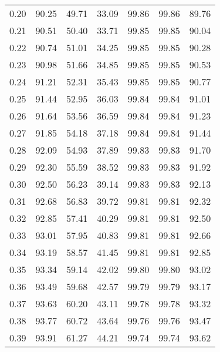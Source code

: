 \begin{tabular}{|c|c|c|c|c|c|c|}
      0.20 &     90.25 &     49.71 &      33.09 &   99.86 &      99.86 &         89.76 \\
      0.21 &     90.51 &     50.40 &      33.71 &   99.85 &      99.85 &         90.04 \\
      0.22 &     90.74 &     51.01 &      34.25 &   99.85 &      99.85 &         90.28 \\
      0.23 &     90.98 &     51.66 &      34.85 &   99.85 &      99.85 &         90.53 \\
      0.24 &     91.21 &     52.31 &      35.43 &   99.85 &      99.85 &         90.77 \\
      0.25 &     91.44 &     52.95 &      36.03 &   99.84 &      99.84 &         91.01 \\
      0.26 &     91.64 &     53.56 &      36.59 &   99.84 &      99.84 &         91.23 \\
      0.27 &     91.85 &     54.18 &      37.18 &   99.84 &      99.84 &         91.44 \\
      0.28 &     92.09 &     54.93 &      37.89 &   99.83 &      99.83 &         91.70 \\
      0.29 &     92.30 &     55.59 &      38.52 &   99.83 &      99.83 &         91.92 \\
      0.30 &     92.50 &     56.23 &      39.14 &   99.83 &      99.83 &         92.13 \\
      0.31 &     92.68 &     56.83 &      39.72 &   99.81 &      99.81 &         92.32 \\
      0.32 &     92.85 &     57.41 &      40.29 &   99.81 &      99.81 &         92.50 \\
      0.33 &     93.01 &     57.95 &      40.83 &   99.81 &      99.81 &         92.66 \\
      0.34 &     93.19 &     58.57 &      41.45 &   99.81 &      99.81 &         92.85 \\
      0.35 &     93.34 &     59.14 &      42.02 &   99.80 &      99.80 &         93.02 \\
      0.36 &     93.49 &     59.68 &      42.57 &   99.79 &      99.79 &         93.17 \\
      0.37 &     93.63 &     60.20 &      43.11 &   99.78 &      99.78 &         93.32 \\
      0.38 &     93.77 &     60.72 &      43.64 &   99.76 &      99.76 &         93.47 \\
      0.39 &     93.91 &     61.27 &      44.21 &   99.74 &      99.74 &         93.62 \\

\end{tabular}
